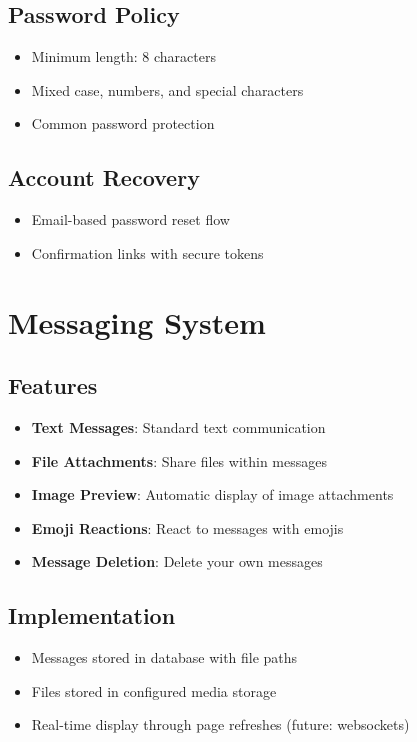 \documentclass[11pt]{article}
\begin{document}
\subsection{Password Policy}
\begin{itemize}
  \item Minimum length: 8 characters
  \item Mixed case, numbers, and special characters
  \item Common password protection
\end{itemize}

\subsection{Account Recovery}
\begin{itemize}
  \item Email-based password reset flow
  \item Confirmation links with secure tokens
\end{itemize}

\section{Messaging System}

\subsection{Features}
\begin{itemize}
  \item \textbf{Text Messages}: Standard text communication
  \item \textbf{File Attachments}: Share files within messages
  \item \textbf{Image Preview}: Automatic display of image attachments
  \item \textbf{Emoji Reactions}: React to messages with emojis
  \item \textbf{Message Deletion}: Delete your own messages
\end{itemize}

\subsection{Implementation}
\begin{itemize}
  \item Messages stored in database with file paths
  \item Files stored in configured media storage
  \item Real-time display through page refreshes (future: websockets)
\end{itemize}
\end{document}

